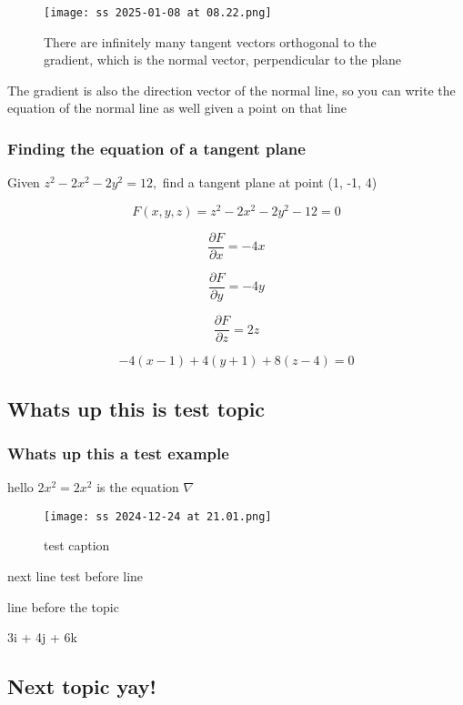 \documentclass{article}
\begin{document}
\begin{figure}[h]
\caption{There are infinitely many tangent vectors orthogonal to the gradient, which is the normal vector, perpendicular to the plane}
\centering
\texttt{[image: ss 2025-01-08 at 08.22.png]}
\end{figure}
The gradient is also the direction vector of the normal line, so you can write the equation of the normal line as well given a point on that line\\

\subsubsection{Finding the equation of a tangent plane}
Given $z^2 - 2x^2 - 2y^2 = 12,$ find a tangent plane at point (1, -1, 4)

\begin{equation}
F(x, y, z) = z^2 - 2x^2 - 2y^2 - 12 = 0
\end{equation}

\begin{equation}
\frac{\partial F}{\partial x} = -4x
\end{equation}

\begin{equation}
\frac{\partial F}{\partial y} = -4y
\end{equation}

\begin{equation}
\frac{\partial F}{\partial z} = 2z
\end{equation}

\begin{equation}
-4(x-1) + 4(y+1) +8(z-4) = 0
\end{equation}

\subsection{Whats up this is test topic}


\subsubsection{Whats up this a test example}

hello $2x^2 = 2x^2$ is the equation $\nabla$


\begin{figure}[h]
\caption{ test caption}
\centering
\texttt{[image: ss 2024-12-24 at 21.01.png]}
\end{figure}

next line test before line

line before the topic

3i + 4j + 6k
\\

\subsection{Next topic yay!}
\end{document}

